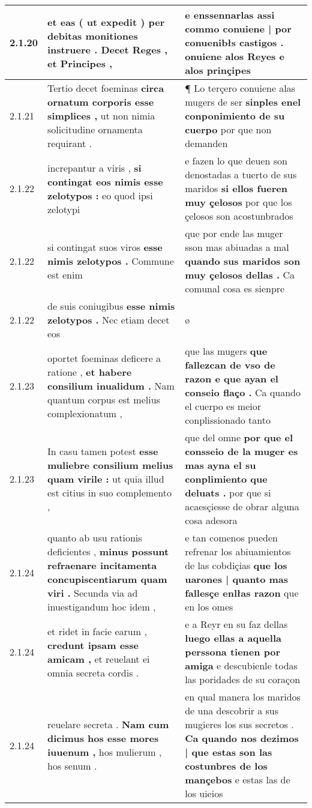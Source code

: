\begin{tabular}{|p{1cm}|p{6.5cm}|p{6.5cm}|}
2.1.20 & et eas ( ut expedit ) \textbf{ per debitas monitiones instruere . } Decet Reges , et Principes , & e enssennarlas \textbf{ assi commo conuiene | por conuenibłs castigos . } onuiene alos Reyes e alos prinçipes \\\hline
2.1.21 & Tertio decet foeminas \textbf{ circa ornatum corporis esse simplices , } ut non nimia solicitudine ornamenta requirant . & ¶ Lo terçero conuiene alas mugers de ser \textbf{ sinples enel conponimiento de su cuerpo } por que non demanden \\\hline
2.1.22 & increpantur a viris , \textbf{ si contingat eos nimis esse zelotypos : } eo quod ipsi zelotypi & e fazen lo que deuen son denostadas a tuerto de sus maridos \textbf{ si ellos fueren muy çelosos } por que los çelosos son acostunbrados \\\hline
2.1.22 & si contingat suos viros \textbf{ esse nimis zelotypos . } Commune est enim & que por ende las muger sson mas abiuadas a mal \textbf{ quando sus maridos son muy çelosos dellas . } Ca comunal cosa es sienpre \\\hline
2.1.22 & de suis coniugibus \textbf{ esse nimis zelotypos . } Nec etiam decet eos & ø \\\hline
2.1.23 & oportet foeminas deficere a ratione , \textbf{ et habere consilium inualidum . } Nam quantum corpus est melius complexionatum , & que las mugers \textbf{ que fallezcan de vso de razon e que ayan el conseio flaço . } Ca quando el cuerpo es meior conplissionado tanto \\\hline
2.1.23 & In casu tamen potest \textbf{ esse muliebre consilium melius quam virile : } ut quia illud est citius in suo complemento , & que del omne \textbf{ por que el consseio de la muger es mas ayna el su conplimiento que deluats . } por que si acaesçiesse de obrar alguna cosa adesora \\\hline
2.1.24 & quanto ab usu rationis deficientes , \textbf{ minus possunt refraenare incitamenta concupiscentiarum quam viri . } Secunda via ad inuestigandum hoc idem , & e tan comenos pueden refrenar los abiuamientos de las cobdiçias \textbf{ que los uarones | quanto mas fallesçe enlłas razon } que en los omes \\\hline
2.1.24 & et ridet in facie earum , \textbf{ credunt ipsam esse amicam , } et reuelant ei omnia secreta cordis . & e a Reyr en su faz dellas \textbf{ luego ellas a aquella perssona tienen por amiga } e descubienle todas las poridades de su coraçon \\\hline
2.1.24 & reuelare secreta . \textbf{ Nam cum dicimus hos esse mores iuuenum , } hos mulierum , hos senum . & en qual manera los maridos de una descobrir a sus mugieres los sus secretos . \textbf{ Ca quando nos dezimos | que estas son las costunbres de los mançebos } e estas las de los uieios \\\hline

\end{tabular}
